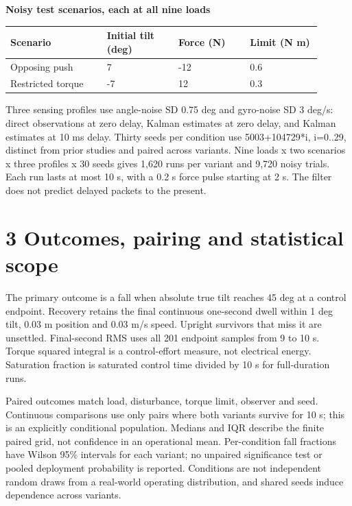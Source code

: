 \documentclass[11pt,a4paper]{article}
\begin{document}
\textbf{Noisy test scenarios, each at all nine loads}
\begin{longtable}{p{0.279\linewidth}p{0.207\linewidth}p{0.207\linewidth}p{0.207\linewidth}}
\toprule
Scenario & Initial tilt (deg) & Force (N) & Limit (N m) \\ \midrule \endhead
Opposing push & 7 & -12 & 0.6 \\
Restricted torque & -7 & 12 & 0.3 \\
\bottomrule
\end{longtable}
Three sensing profiles use angle-noise SD 0.75 deg and gyro-noise SD 3 deg/s: direct observations at zero delay, Kalman estimates at zero delay, and Kalman estimates at 10 ms delay. Thirty seeds per condition use 5003+104729*i, i=0..29, distinct from prior studies and paired across variants. Nine loads x two scenarios x three profiles x 30 seeds gives 1,620 runs per variant and 9,720 noisy trials. Each run lasts at most 10 s, with a 0.2 s force pulse starting at 2 s. The filter does not predict delayed packets to the present.

\clearpage
\section*{3 Outcomes, pairing and statistical scope}
The primary outcome is a fall when absolute true tilt reaches 45 deg at a control endpoint. Recovery retains the final continuous one-second dwell within 1 deg tilt, 0.03 m position and 0.03 m/s speed. Upright survivors that miss it are unsettled. Final-second RMS uses all 201 endpoint samples from 9 to 10 s. Torque squared integral is a control-effort measure, not electrical energy. Saturation fraction is saturated control time divided by 10 s for full-duration runs.

Paired outcomes match load, disturbance, torque limit, observer and seed. Continuous comparisons use only pairs where both variants survive for 10 s; this is an explicitly conditional population. Medians and IQR describe the finite paired grid, not confidence in an operational mean. Per-condition fall fractions have Wilson 95\% intervals for each variant; no unpaired significance test or pooled deployment probability is reported. Conditions are not independent random draws from a real-world operating distribution, and shared seeds induce dependence across variants.
\end{document}
